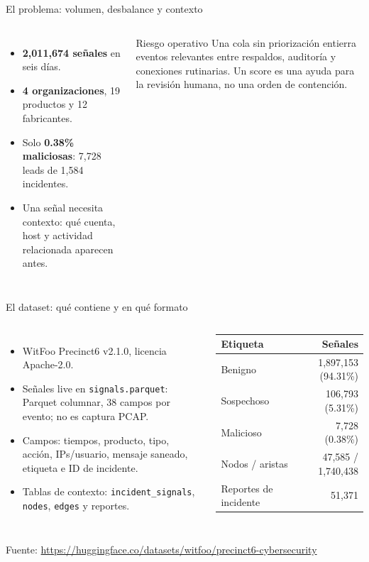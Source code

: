 \documentclass[aspectratio=169,10pt]{beamer}
\begin{document}
\begin{frame}{El problema: volumen, desbalance y contexto}
\begin{columns}[T,onlytextwidth]
  \begin{itemize}
    \item \textbf{2,011,674 señales} en seis días.
    \item \textbf{4 organizaciones}, 19 productos y 12 fabricantes.
    \item Solo \textbf{0.38\% maliciosas}: 7,728 leads de 1,584 incidentes.
    \item Una señal necesita contexto: qué cuenta, host y actividad relacionada aparecen antes.
  \end{itemize}
  \begin{alertblock}{Riesgo operativo}
    Una cola sin priorización entierra eventos relevantes entre respaldos, auditoría y conexiones rutinarias. Un score es una ayuda para la revisión humana, no una orden de contención.
  \end{alertblock}
\end{columns}
\end{frame}

\begin{frame}{El dataset: qué contiene y en qué formato}
\begin{columns}[T,onlytextwidth]
  \begin{itemize}
    \item WitFoo Precinct6 v2.1.0, licencia Apache-2.0.
    \item Señales live en \texttt{signals.parquet}: Parquet columnar, 38 campos por evento; no es captura PCAP.
    \item Campos: tiempos, producto, tipo, acción, IPs/usuario, mensaje saneado, etiqueta e ID de incidente.
    \item Tablas de contexto: \texttt{incident\_signals}, \texttt{nodes}, \texttt{edges} y reportes.
  \end{itemize}
  \begin{tabular}{@{}lr@{}}
    \toprule
    Etiqueta & Señales \\
    \midrule
    Benigno & 1,897,153 (94.31\%) \\
    Sospechoso & 106,793 (5.31\%) \\
    Malicioso & 7,728 (0.38\%) \\
    \midrule
    Nodos / aristas & 47,585 / 1,740,438 \\
    Reportes de incidente & 51,371 \\
    \bottomrule
  \end{tabular}
\end{columns}
\vspace{0.2cm}
\footnotesize Fuente: \url{https://huggingface.co/datasets/witfoo/precinct6-cybersecurity}
\end{frame}
\end{document}
